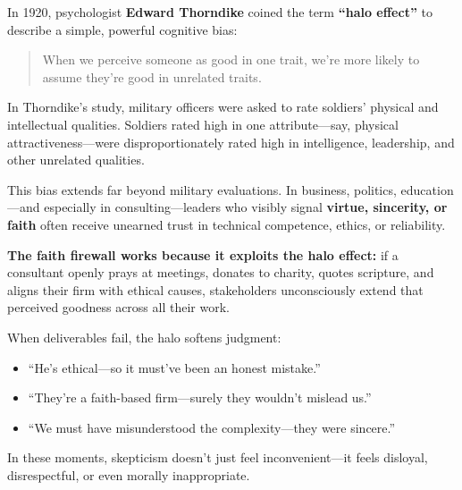 \begin{tcolorbox}[colback=blue!5!white, colframe=blue!50!black, breakable,
    title={Psychological Sidebar: The Halo Effect — When Virtue in One Domain Shields Vice in Another}]
  
  In 1920, psychologist \textbf{Edward Thorndike} coined the term \textbf{“halo effect”} to describe a simple, powerful cognitive bias:
  
  \begin{quote}
  When we perceive someone as good in one trait, we’re more likely to assume they’re good in unrelated traits.
  \end{quote}
  
  In Thorndike’s study, military officers were asked to rate soldiers’ physical and intellectual qualities. Soldiers rated high in one attribute—say, physical attractiveness—were disproportionately rated high in intelligence, leadership, and other unrelated qualities.
  
  \medskip
  
  This bias extends far beyond military evaluations. In business, politics, education—and especially in consulting—leaders who visibly signal \textbf{virtue, sincerity, or faith} often receive unearned trust in technical competence, ethics, or reliability.
  
  \medskip
  
  \textbf{The faith firewall works because it exploits the halo effect:} if a consultant openly prays at meetings, donates to charity, quotes scripture, and aligns their firm with ethical causes, stakeholders unconsciously extend that perceived goodness across all their work.
  
  \medskip
  
  When deliverables fail, the halo softens judgment:

  \medskip
  
  \begin{itemize}
      \item “He’s ethical—so it must’ve been an honest mistake.”
      \item “They’re a faith-based firm—surely they wouldn’t mislead us.”
      \item “We must have misunderstood the complexity—they were sincere.”
  \end{itemize}

  \medskip
  
  In these moments, skepticism doesn’t just feel inconvenient—it feels disloyal, disrespectful, or even morally inappropriate.
  

\end{tcolorbox}
